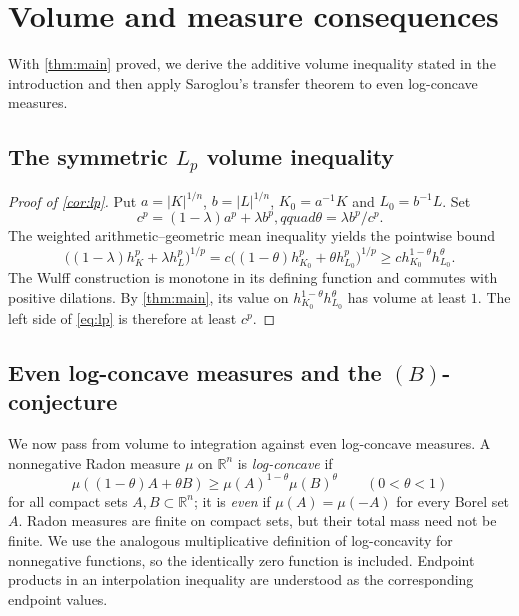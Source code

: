 \section{Volume and measure consequences}\label{sec:consequences}

With \cref{thm:main} proved, we derive the additive volume inequality stated in the introduction and then apply Saroglou's transfer theorem to even log-concave measures.

\subsection{The symmetric \texorpdfstring{$L_p$}{Lp} volume inequality}
\label{subsec:lp-proof}

\begin{proof}[Proof of \cref{cor:lp}]
Put $a=|K|^{1/n}$, $b=|L|^{1/n}$, $K_0=a^{-1}K$ and $L_0=b^{-1}L$. Set
\[
 c^p=(1-\lambda)a^p+\lambda b^p,qquad
 \theta=\lambda b^p/c^p.
\]
The weighted arithmetic--geometric mean inequality yields the pointwise bound
\[
 \bigl((1-\lambda)h_K^p+\lambda h_L^p\bigr)^{1/p}
 =c\bigl((1-\theta)h_{K_0}^p+\theta h_{L_0}^p\bigr)^{1/p}
 \geq c h_{K_0}^{1-\theta}h_{L_0}^\theta.
\]
The Wulff construction is monotone in its defining function and commutes with positive dilations. By \cref{thm:main}, its value on $h_{K_0}^{1-\theta}h_{L_0}^\theta$ has volume at least $1$. The left side of \eqref{eq:lp} is therefore at least $c^p$.
\end{proof}

\subsection{Even log-concave measures and the \texorpdfstring{$(B)$}{(B)}-conjecture}
\label{subsec:sec-measure}

We now pass from volume to integration against even log-concave measures. A nonnegative Radon measure $\mu$ on $\mathbb{R}^n$ is \emph{log-concave} if
\[
 \mu((1-\theta)A+\theta B)
 \ge \mu(A)^{1-\theta}\mu(B)^\theta
 \qquad(0<\theta<1)
\]
for all compact sets $A,B\subset\mathbb{R}^n$; it is \emph{even} if $\mu(A)=\mu(-A)$ for every Borel set $A$. Radon measures are finite on compact sets, but their total mass need not be finite. We use the analogous multiplicative definition of log-concavity for nonnegative functions, so the identically zero function is included. Endpoint products in an interpolation inequality are understood as the corresponding endpoint values.

